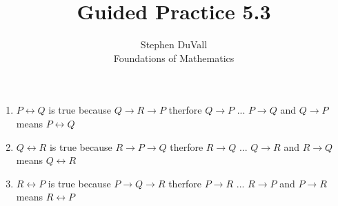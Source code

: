 \documentclass[12pt]{article}
\newenvironment{bgact}[2][Beginning Activity]{\begin{trivlist}
\item[\hskip \labelsep {\bfseries #1}\hskip \labelsep {\bfseries #2.}]}{\end{trivlist}}
\begin{document}
\title{Guided Practice 5.3}
\author{Stephen DuVall \\
Foundations of Mathematics}

\maketitle

\begin{bgact}{2.2}
\hfill
\begin{enumerate}
\item[(a)] $P \leftrightarrow Q$ is true because $Q \rightarrow R \rightarrow P$ therfore $Q \rightarrow P$ ... $P \rightarrow Q$ and $Q \rightarrow P$ means $P \leftrightarrow Q$ 
\item[(b)] $Q \leftrightarrow R$ is true because $R \rightarrow P \rightarrow Q$ therfore $R \rightarrow Q$ ... $Q \rightarrow R$ and $R \rightarrow Q$ means $Q \leftrightarrow R$ 
\item[(c)] $R \leftrightarrow P$ is true because $P \rightarrow Q \rightarrow R$ therfore $P \rightarrow R$ ... $R \rightarrow P$ and $P \rightarrow R$ means $R \leftrightarrow P$ 
\end{enumerate}
\end{bgact}
\end{document}
